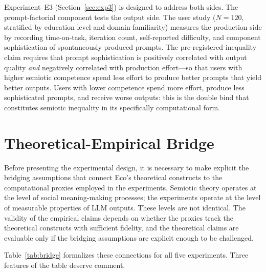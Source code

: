\documentclass[12pt,a4paper]{article}
\begin{document}
Experiment~E3 (Section~\ref{sec:exp3}) is designed to address both sides.
The prompt-factorial component tests the output side. The user study
($N = 120$, stratified by education level and domain familiarity) measures
the production side by recording time-on-task, iteration count, self-reported
difficulty, and component sophistication of spontaneously produced prompts.
The pre-registered inequality claim requires that prompt sophistication is
positively correlated with output quality \emph{and} negatively correlated
with production effort---so that users with higher semiotic competence spend
less effort to produce better prompts that yield better outputs. Users with
lower competence spend more effort, produce less sophisticated prompts, and
receive worse outputs: this is the double bind that constitutes semiotic
inequality in its specifically computational form.


\section{Theoretical-Empirical Bridge}
\label{sec:bridge}

Before presenting the experimental design, it is necessary to make explicit
the bridging assumptions that connect Eco's theoretical constructs to the
computational proxies employed in the experiments. Semiotic theory operates
at the level of social meaning-making processes; the experiments operate at
the level of measurable properties of LLM outputs. These levels are not
identical. The validity of the empirical claims depends on whether the
proxies track the theoretical constructs with sufficient fidelity, and the
theoretical claims are evaluable only if the bridging assumptions are explicit
enough to be challenged.

Table~\ref{tab:bridge} formalizes these connections for all five experiments.
Three features of the table deserve comment.
\end{document}
